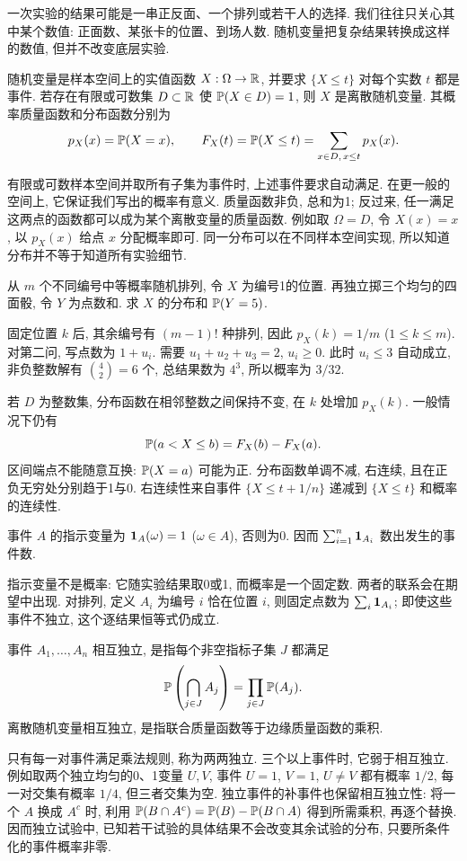 
一次实验的结果可能是一串正反面、一个排列或若干人的选择. 我们往往只关心其中某个数值: 正面数、某张卡的位置、到场人数. 随机变量把复杂结果转换成这样的数值, 但并不改变底层实验.
\begin{definition}
随机变量是样本空间上的实值函数 $X:\Omega\to\mathbb R$, 并要求 $\{X\le t\}$ 对每个实数 $t$ 都是事件. 若存在有限或可数集 $D\subset\mathbb R$ 使 $\mathbb P(X\in D)=1$, 则 $X$ 是离散随机变量. 其概率质量函数和分布函数分别为
\[
p_X(x)=\mathbb P(X=x),\qquad F_X(t)=\mathbb P(X\le t)=\sum_{x\in D,\,x\le t}p_X(x).
\]
\end{definition}
有限或可数样本空间并取所有子集为事件时, 上述事件要求自动满足. 在更一般的空间上, 它保证我们写出的概率有意义. 质量函数非负, 总和为1; 反过来, 任一满足这两点的函数都可以成为某个离散变量的质量函数. 例如取 $\Omega=D$, 令 $X(x)=x$, 以 $p_X(x)$ 给点 $x$ 分配概率即可. 同一分布可以在不同样本空间实现, 所以知道分布并不等于知道所有实验细节.

\begin{example}
从 $m$ 个不同编号中等概率随机排列, 令 $X$ 为编号1的位置. 再独立掷三个均匀的四面骰, 令 $Y$ 为点数和. 求 $X$ 的分布和 $\mathbb P(Y=5)$.
\end{example}
\begin{solution}
固定位置 $k$ 后, 其余编号有 $(m-1)!$ 种排列, 因此 $p_X(k)=1/m$ ($1\le k\le m$). 对第二问, 写点数为 $1+u_i$. 需要 $u_1+u_2+u_3=2$, $u_i\ge0$. 此时 $u_i\le3$ 自动成立, 非负整数解有 $\binom{4}{2}=6$ 个, 总结果数为 $4^3$, 所以概率为 $3/32$.
\end{solution}

若 $D$ 为整数集, 分布函数在相邻整数之间保持不变, 在 $k$ 处增加 $p_X(k)$. 一般情况下仍有
\[
\mathbb P(a<X\le b)=F_X(b)-F_X(a).
\]
区间端点不能随意互换: $\mathbb P(X=a)$ 可能为正. 分布函数单调不减, 右连续, 且在正负无穷处分别趋于1与0. 右连续性来自事件 $\{X\le t+1/n\}$ 递减到 $\{X\le t\}$ 和概率的连续性.

\begin{definition}
事件 $A$ 的指示变量为 $\mathbf 1_A(\omega)=1$ ($\omega\in A$), 否则为0. 因而 $\sum_{i=1}^n\mathbf 1_{A_i}$ 数出发生的事件数.
\end{definition}
指示变量不是概率: 它随实验结果取0或1, 而概率是一个固定数. 两者的联系会在期望中出现. 对排列, 定义 $A_i$ 为编号 $i$ 恰在位置 $i$, 则固定点数为 $\sum_i\mathbf 1_{A_i}$; 即使这些事件不独立, 这个逐结果恒等式仍成立.

\begin{definition}
事件 $A_1,\ldots,A_n$ 相互独立, 是指每个非空指标子集 $J$ 都满足
\[
\mathbb P\left(\bigcap_{j\in J}A_j\right)=\prod_{j\in J}\mathbb P(A_j).
\]
离散随机变量相互独立, 是指联合质量函数等于边缘质量函数的乘积.
\end{definition}
只有每一对事件满足乘法规则, 称为两两独立. 三个以上事件时, 它弱于相互独立. 例如取两个独立均匀的0、1变量 $U,V$, 事件 $U=1$, $V=1$, $U\ne V$ 都有概率 $1/2$, 每一对交集有概率 $1/4$, 但三者交集为空. 独立事件的补事件也保留相互独立性: 将一个 $A$ 换成 $A^c$ 时, 利用 $\mathbb P(B\cap A^c)=\mathbb P(B)-\mathbb P(B\cap A)$ 得到所需乘积, 再逐个替换. 因而独立试验中, 已知若干试验的具体结果不会改变其余试验的分布, 只要所条件化的事件概率非零.

